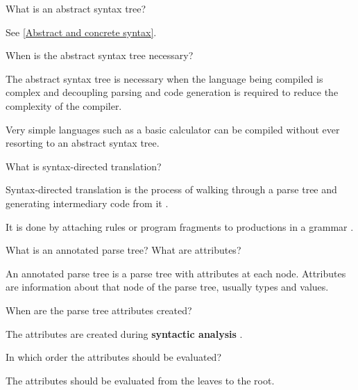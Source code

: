 \begin{Exercise}[difficulty=1]
What is an abstract syntax tree?
\end{Exercise}
\begin{Answer}
See \ref{Abstract and concrete syntax}.
\end{Answer}

\begin{Exercise}
When is the abstract syntax tree necessary?
\end{Exercise}
\begin{Answer}
The abstract syntax tree is necessary when the language being compiled is complex and decoupling parsing and code generation is required to reduce the complexity of the compiler.

Very simple languages such as a basic calculator can be compiled without ever resorting to an abstract syntax tree.
\end{Answer}

\begin{Exercise}
What is syntax-directed translation?
\end{Exercise}
\begin{Answer}
Syntax-directed translation is the process of walking through a parse tree and generating intermediary code from it \cite[p.~12]{compilers-aho-2007}.

It is done by attaching rules or program fragments to productions in a grammar \cite[p.~52]{compilers-aho-2007}.
\end{Answer}

\begin{Exercise}
What is an annotated parse tree? What are attributes?
\end{Exercise}
\begin{Answer}
An annotated parse tree is a parse tree with attributes at each node.
Attributes are information about that node of the parse tree, usually types and values.
\end{Answer}

\begin{Exercise}
When are the parse tree attributes created?
\end{Exercise}
\begin{Answer}
The attributes are created during \textbf{syntactic analysis} \cite[p.~54]{compilers-aho-2007}.
\end{Answer}

\begin{Exercise}
In which order the attributes should be evaluated?
\end{Exercise}
\begin{Answer}
The attributes should be evaluated from the leaves to the root.
\end{Answer}

